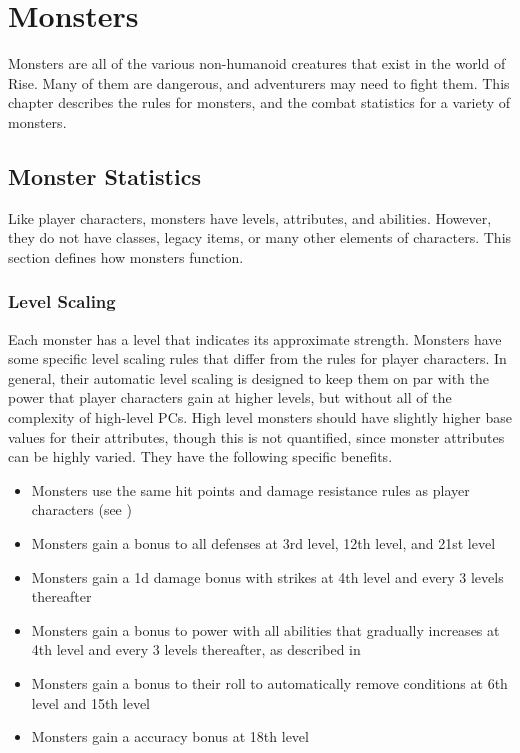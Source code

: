 \chapter{Monsters}

Monsters are all of the various non-humanoid creatures that exist in the world of Rise.
Many of them are dangerous, and adventurers may need to fight them.
This chapter describes the rules for monsters, and the combat statistics for a variety of monsters.

\section{Monster Statistics}
    Like player characters, monsters have levels, attributes, and abilities.
    However, they do not have classes, legacy items, or many other elements of characters.
    This section defines how monsters function.

    \subsection{Level Scaling}
        Each monster has a level that indicates its approximate strength.
        Monsters have some specific level scaling rules that differ from the rules for player characters.
        In general, their automatic level scaling is designed to keep them on par with the power that player characters gain at higher levels, but without all of the complexity of high-level PCs.
        High level monsters should have slightly higher base values for their attributes, though this is not quantified, since monster attributes can be highly varied.
        They have the following specific benefits.
        \begin{itemize}
            \item Monsters use the same hit points and damage resistance rules as player characters (see )
            \item Monsters gain a  bonus to all defenses at 3rd level, 12th level, and 21st level
            \item Monsters gain a \plus1d damage bonus with strikes at 4th level and every 3 levels thereafter
            \item Monsters gain a  bonus to power with all abilities that gradually increases at 4th level and every 3 levels thereafter, as described in 
            \item Monsters gain a  bonus to their roll to automatically remove conditions at 6th level and 15th level
            \item Monsters gain a  accuracy bonus at 18th level
        \end{itemize}

